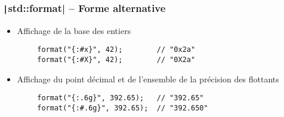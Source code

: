 \documentclass[C++.tex]{subfiles}
\begin{document}
\begin{frame}[fragile]
	\frametitle{\texttt|std::format| -- Forme alternative}
	\begin{itemize}
		\item Affichage de la base des entiers
	\end{itemize}

	\begin{verbatim}
		format("{:#x}", 42);        // "0x2a"
		format("{:#X}", 42);        // "0X2a"
	\end{verbatim}

	\begin{itemize}
		\item Affichage du point décimal et de l'ensemble de la précision des flottants
	\end{itemize}

	\begin{verbatim}
		format("{:.6g}", 392.65);   // "392.65"
		format("{:#.6g}", 392.65);  // "392.650"
	\end{verbatim}


\end{frame}
\end{document}
